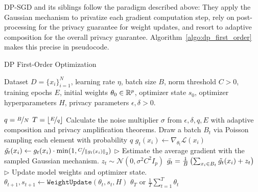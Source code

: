 DP-SGD and its siblings follow the paradigm described above: They apply the Gaussian mechanism to privatize each gradient computation step, rely on post-processing for the privacy guarantee for weight updates, and resort to adaptive composition for the overall privacy guarantee. 
Algorithm~\ref{algo:dp_first_order} makes this precise in pseudocode.
\begin{algorithm}[H]
\centering
\caption{DP First-Order Optimization}
\begin{algorithmic}[1]
  Dataset $D=\{x_i\}_{i=1}^N$, learning rate $\eta$, batch size $B$, norm threshold $C > 0$, training epochs $E$, initial weights $\theta_0\in\mathbb{R}^p$, optimizer state $s_0$, optimizer hyperparameters $H$, privacy parameters $\epsilon, \delta > 0$.

  \State $q = \nicefrac{B}{N}$ 
  \State $T = \lfloor  \nicefrac{E}{q}  \rfloor$ 
  \State Calculate the noise multiplier $\sigma$ from $\epsilon, \delta, q, E$ with adaptive composition and privacy amplification theorems.
    \State Draw a batch $B_t$ via Poisson sampling each element with probability $q$
        \State $g_t(x_i) \gets \nabla_{\theta_t} \mathcal{L}(x_i)$ 
        \State $\tilde{g_t}(x_i) \gets g_t(x_i) \cdot \min(1, \nicefrac{C}{ \left\lVert g_t(x_i)\right\rVert_2 })$ 
    \EndFor
    \State \(\triangleright\) {\color{red} Estimate the average gradient with the sampled Gaussian mechanism.} 
    \State $z_t \sim \mathcal{N}(0, \sigma^2 C^2 I_p)$
    \State $\bar{g_t} = \frac{1}{B} \left( 
        \sum_{x_i \in B_t} \tilde{g_t}(x_i) + z_t
    \right)$
    \State \(\triangleright\) {\color{red} Update model weights and optimizer state.}
    \State $\theta_{t + 1}, s_{t+1} \gets \texttt{WeightUpdate}(\theta_t, s_t, H)$
    \EndFor
\State \Return $\theta_{T}$ or $\frac{1}{T}\sum_{t=1}^T \theta_t$
\end{algorithmic}
\label{algo:dp_first_order}
\end{algorithm}


